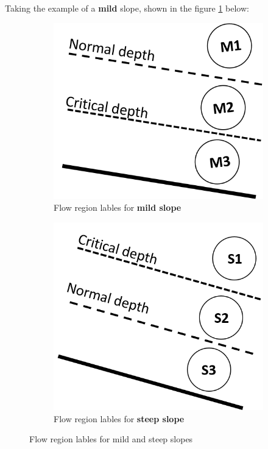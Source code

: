\documentclass[a4paper, 12pt, british]{article} %
\numberwithin{equation}{section}
\numberwithin{figure}{section}
\numberwithin{table}{section}
\begin{document}
Taking the example of a \textbf{mild} slope, shown in the figure \ref{fig:1151b} below:
\begin{figure}[H]
	\centering
	\begin{subfigure}[b]{0.4\textwidth}
		\centering
		\includegraphics[scale=0.5]{./images/mild_slope_regions.png}
		\caption{Flow region lables for \textbf{mild slope}}
		\label{fig:1151b}
	\end{subfigure}
	\qquad \qquad
	\begin{subfigure}[b]{0.4\textwidth}
		\centering
		\includegraphics[scale=0.5]{./images/steep_slope_regions.png}
		\caption{Flow region lables for \textbf{steep slope}}
		\label{fig:1151c}
	\end{subfigure}
	\caption{Flow region lables for mild and steep slopes}
	\label{fig:1151}
\end{figure} 
\end{document}
